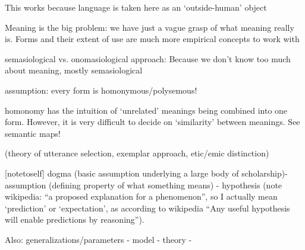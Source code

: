 %
This works because language is taken here as an `outside-human' object

Meaning is the big problem: we have just a vague grasp of what meaning really is. Forms and their extent of use are much more empirical concepts to work with

semasiological vs. onomasiological approach: Because we don't know too much about meaning, mostly semasiological


%
assumption: every form is homonymous/polysemous!

homonomy has the intuition of `unrelated' meanings being combined into one form. However, it is very difficult to decide on `similarity' between meanings. See semantic maps!

(theory of utterance selection, exemplar approach, etic/emic distinction)

[notetoself] dogma (basic assumption underlying a large body of scholarship)- assumption (defining property of what something means) - hypothesis (note wikipedia: ``a proposed explanation for a phenomenon'', so I actually mean `prediction' or `expectation', as according to wikipedia ``Any useful hypothesis will enable predictions by reasoning'').

Also: generalizations/parameters - model - theory - 
